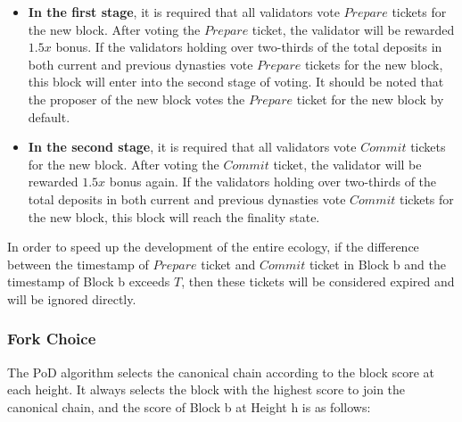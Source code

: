 \begin{itemize}

\item \textbf{In the first stage}, it is required that all validators vote $Prepare$ tickets for the new block. After voting the $Prepare$ ticket, the validator will be rewarded $1.5x$ bonus. If the validators holding over two-thirds of the total deposits in both current and previous dynasties vote $Prepare$ tickets for the new block, this block will enter into the second stage of voting. It should be noted that the proposer of the new block votes the $Prepare$ ticket for the new block by default.


\item \textbf{In the second stage}, it is required that all validators vote $Commit$ tickets for the new block. After voting the $Commit$ ticket, the validator will be rewarded $1.5x$ bonus again. If the validators holding over two-thirds of the total deposits in both current and previous dynasties vote $Commit$ tickets for the new block, this block will reach the finality state.

\end{itemize}

In order to speed up the development of the entire ecology, if the difference between the timestamp of $Prepare$ ticket and $Commit$ ticket in Block b and the timestamp of Block b exceeds $T$, then these tickets will be considered expired and will be ignored directly.


\subsubsection{Fork Choice}
\label{pod:design:fork}

The PoD algorithm selects the canonical chain according to the block score at each height. It always selects the block with the highest score to join the canonical chain, and the score of Block b at Height h is as follows:

